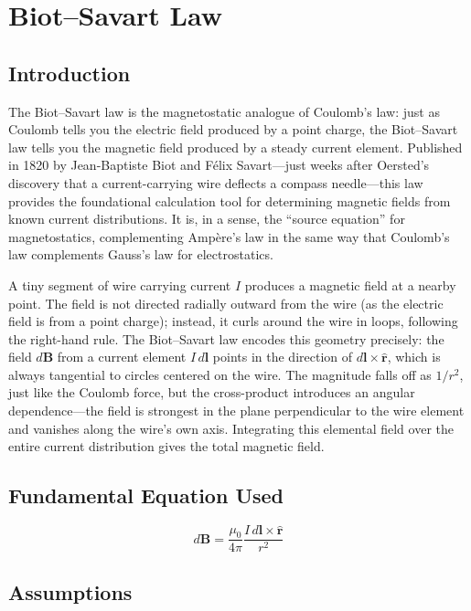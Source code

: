 \chapter{Biot--Savart Law}

\section*{Introduction}

The Biot--Savart law is the magnetostatic analogue of Coulomb's law: just as Coulomb tells you the electric field produced by a point charge, the Biot--Savart law tells you the magnetic field produced by a steady current element. Published in 1820 by Jean-Baptiste Biot and Félix Savart---just weeks after Oersted's discovery that a current-carrying wire deflects a compass needle---this law provides the foundational calculation tool for determining magnetic fields from known current distributions. It is, in a sense, the ``source equation'' for magnetostatics, complementing Ampère's law in the same way that Coulomb's law complements Gauss's law for electrostatics.

A tiny segment of wire carrying current $I$ produces a magnetic field at a nearby point. The field is not directed radially outward from the wire (as the electric field is from a point charge); instead, it curls around the wire in loops, following the right-hand rule. The Biot--Savart law encodes this geometry precisely: the field $d\mathbf{B}$ from a current element $I\,d\mathbf{l}$ points in the direction of $d\mathbf{l}\times\hat{\mathbf{r}}$, which is always tangential to circles centered on the wire. The magnitude falls off as $1/r^2$, just like the Coulomb force, but the cross-product introduces an angular dependence---the field is strongest in the plane perpendicular to the wire element and vanishes along the wire's own axis. Integrating this elemental field over the entire current distribution gives the total magnetic field.
\section*{Fundamental Equation Used}

\begin{equation}
d\mathbf{B} = \frac{\mu_0}{4\pi}\frac{I\,d\mathbf{l}\times\hat{\mathbf{r}}}{r^2}
\end{equation}
\section*{Assumptions}

